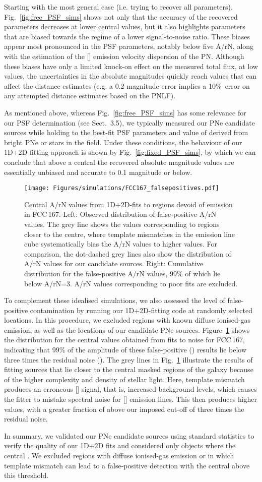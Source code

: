 \documentclass{aa}
\newcommand{\placefigsix}{
\begin{figure}
    \texttt{[image: Figures/simulations/FCC167\_falsepositives.pdf]}
    \caption{Central A/rN values from 1D+2D-fits to regions devoid of emission in FCC\,167. Left: Observed distribution of false-positive A/rN values. The grey line shows the values corresponding to regions closer to the centre, where template mismatches in the emission line cube systematically bias the A/rN values to higher values. For comparison, the dot-dashed grey lines also show the distribution of A/rN values for our candidate sources. Right: Cumulative distribution for the false-positive A/rN values, 99\% of which lie below A/rN=3. A/rN values corresponding to poor fits are excluded.} \label{fig:FCC167_falsepositive}
\end{figure}
}
\begin{document}
Starting with the most general case (i.e. trying to recover all parameters), Fig.~\ref{fig:free_PSF_sims} shows not only that the accuracy of the recovered parameters decreases at lower central  values, but it also highlights parameters that are biased towards the regime of a lower signal-to-noise ratio. These biases appear most pronounced in the PSF parameters, notably below five A/rN, along with the estimation of the [] emission velocity dispersion  of the PN. Although these biases have only a limited knock-on effect on the measured total flux, at low  values, the uncertainties in the absolute  magnitudes quickly reach values that can affect the distance estimates (e.g. a 0.2 magnitude error implies a 10\%\ error on any attempted distance estimates based on the PNLF).

As mentioned above, whereas Fig.~\ref{fig:free_PSF_sims} has some relevance for our PSF determination (see Sect.~3.5), we typically measured our PNe candidate sources while holding to the best-fit PSF parameters and value of  derived from bright PNe or stars in the field. Under these conditions, the behaviour of our 1D+2D-fitting approach is shown by Fig.~\ref{fig:fixed_PSF_sims}, by which we can conclude that above a central  the recovered absolute magnitude values are essentially unbiased and accurate to 0.1 magnitude or below. 

\placefigsix

To complement these idealised simulations, we also assessed the level of false-positive contamination by running our 1D+2D-fitting code at randomly selected locations. In this procedure, we excluded regions with known diffuse ionised-gas emission, as well as the locations of our candidate PNe sources. Figure~\ref{fig:FCC167_falsepositive} shows the distribution for the central  values obtained from fits to noise for FCC\,167, indicating that 99\% of the amplitude of these false-positive () results lie below three times the residual noise (). The grey lines in Fig.~\ref{fig:FCC167_falsepositive} illustrate the results of fitting sources that lie closer to the central masked regions of the galaxy because of the higher complexity and density of stellar light. Here, template mismatch produces an erroneous [] signal, that is, increased background levels, which causes the fitter to mistake spectral noise for [] emission lines. This then produces higher  values, with a greater fraction of  above our imposed cut-off of three times the residual noise.

In summary, we validated our PNe candidate sources using standard  statistics to verify the quality of our 1D+2D fits and considered only objects where the central . We excluded regions with diffuse ionised-gas emission or in which template mismatch can lead to a false-positive detection with the central  above this threshold.
\end{document}
